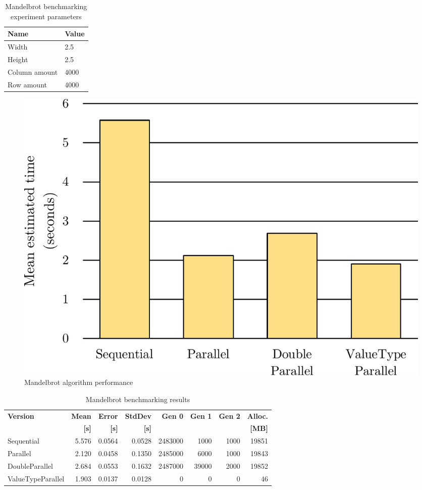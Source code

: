 \begin{table}[!ht]
    \centering
    \caption{Mandelbrot benchmarking experiment parameters}
		\label{tab:MandelbrotParameters}
    \begin{tabular}{p{3cm}p{3cm}}
			\toprule
			\bfseries Name 	&
			\bfseries Value \\
			\midrule
			Width & 2.5 \\
			Height & 2.5 \\
			Column amount & 4000 \\ 
			Row amount  & 4000 \\	
			\bottomrule
    \end{tabular}
\end{table}

\begin{figure}[htb]
\centering
\includegraphics[width=.62\linewidth]{figures04/Mandelbrot.pdf}
\caption{Mandelbrot algorithm performance}
\label{fig:MandelbrotPerformance}
\end{figure}

\begin{table}[ht]\small
    \centering
    \caption{Mandelbrot benchmarking results}
		\label{tab:MandelbrotBenchmarking}
    \begin{tabularx}{\linewidth}{Xrrrrrrr}
		  \toprule
			\toprule
			\bfseries Version 		&
			\bfseries Mean 	      &
			\bfseries Error       &
			\bfseries StdDev 	    &
			\bfseries Gen 0	    	&
			\bfseries Gen 1	    	&
			\bfseries Gen 2	    	&
			\bfseries Alloc.      \\ 
			&
			\bfseries {[}s{]} &
			\bfseries {[}s{]} &
			\bfseries {[}s{]} &
			&
			&
			&
			\bfseries{[}MB{]} \\			
			\midrule 
			Sequential & 5.576 & 0.0564 & 0.0528 & 2483000 & 1000 & 1000 & 19851  \\ 
			Parallel & 2.120 & 0.0458 & 0.1350 & 2485000 & 6000 & 1000 & 19843 \\ 
			DoubleParallel & 2.684 & 0.0553 & 0.1632 & 2487000 & 39000 & 2000 & 19852  \\ 
			ValueTypeParallel & 1.903 & 0.0137 & 0.0128 & 0 & 0 & 0 & 46  \\ 
			\bottomrule
	\end{tabularx}
\end{table}



